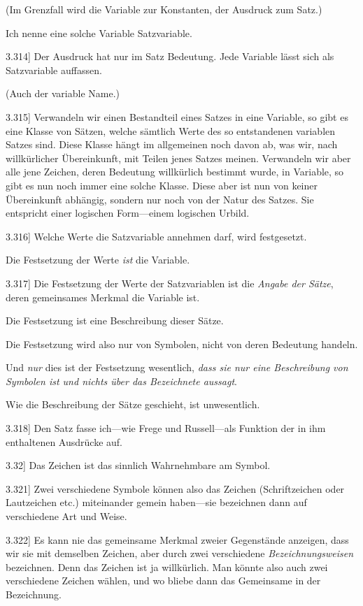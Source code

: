 \documentclass[12pt,oneside]{book}[2007/10/19]
\newcommand{\PropERef}[1]{\hyperref[PropE:#1]{#1}}
\newcommand{\PropositionG}[2]{%
  \item[\phantomsection\label{PropG:#1}\PropERef{#1}] #2%
}
\newcommand{\Emph}[1]{\emph{#1}}%
\begin{document}
\begin{propositions}
{(Im Grenzfall wird die Variable zur Konstanten,
der Ausdruck zum Satz.)

Ich nenne eine solche Variable \glqq{}Satzvariable\grqq{}.}


\PropositionG{3.314}
{Der Ausdruck hat nur im Satz Bedeutung.
Jede Variable lässt sich als Satzvariable auffassen.

(Auch der variable Name.)}


\PropositionG{3.315}
{Verwandeln wir einen Bestandteil eines Satzes
in eine Variable, so gibt es eine Klasse von Sätzen,
welche sämtlich Werte des so entstandenen variablen
Satzes sind. Diese Klasse hängt im allgemeinen
noch davon ab, was wir, nach willkürlicher
Übereinkunft, mit Teilen jenes Satzes meinen.
Verwandeln wir aber alle jene Zeichen, deren
Bedeutung willkürlich bestimmt wurde, in Variable,
so gibt es nun noch immer eine solche Klasse.
Diese aber ist nun von keiner Übereinkunft
abhängig, sondern nur noch von der Natur des
Satzes. Sie entspricht einer logischen Form---einem
logischen Urbild.}


\PropositionG{3.316}
{Welche Werte die Satzvariable annehmen darf,
wird festgesetzt.

Die Festsetzung der Werte \Emph{ist} die Variable.}


\PropositionG{3.317}
{Die Festsetzung der Werte der Satzvariablen
ist die \Emph{Angabe der Sätze}, deren gemeinsames
Merkmal die Variable ist.

Die Festsetzung ist eine Beschreibung dieser
Sätze.

Die Festsetzung wird also nur von Symbolen,
nicht von deren Bedeutung handeln.

Und \Emph{nur} dies ist der Festsetzung wesentlich,
\Emph{dass sie nur eine Beschreibung von
Symbolen ist und nichts über das Bezeichnete
aussagt}.

Wie die Beschreibung der Sätze geschieht, ist
unwesentlich.}


\PropositionG{3.318}
{Den Satz fasse ich---wie Frege und Russell---als
Funktion der in ihm enthaltenen Ausdrücke auf.}


\PropositionG{3.32}
{Das Zeichen ist das sinnlich Wahrnehmbare am
Symbol.}


\PropositionG{3.321}
{Zwei verschiedene Symbole können also das
Zeichen (Schriftzeichen oder Lautzeichen etc.)
miteinander gemein haben---sie bezeichnen dann
auf verschiedene Art und Weise.}


\PropositionG{3.322}
{Es kann nie das gemeinsame Merkmal zweier
Gegenstände anzeigen, dass wir sie mit demselben
Zeichen, aber durch zwei verschiedene \Emph{Bezeichnungsweisen}
bezeichnen. Denn das Zeichen
ist ja willkürlich. Man könnte also auch zwei verschiedene
Zeichen wählen, und wo bliebe dann das
Gemeinsame in der Bezeichnung.}



\end{propositions}
\end{document}

